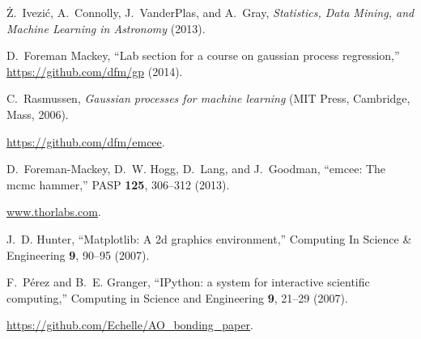 \documentclass[osajnl,twocolumn,showpacs,superscriptaddress,11pt]{revtex4-1} %
\begin{document}
\begin{thebibliography}{10}
{\.Z}.~{Ivezi{\'c}}, A.~{Connolly}, J.~{VanderPlas}, and A.~{Gray},
  \emph{{Statistics, Data Mining, and Machine Learning in Astronomy}} (2013).

D.~{F}oreman Mackey, \enquote{Lab section for a course on gaussian process
  regression,} \url{https://github.com/dfm/gp} (2014).

C.~Rasmussen, \emph{Gaussian processes for machine learning} (MIT Press,
  Cambridge, Mass, 2006).

\protect \url {https://github.com/dfm/emcee}.

D.~{Foreman-Mackey}, D.~W. {Hogg}, D.~{Lang}, and J.~{Goodman}, \enquote{emcee:
  The mcmc hammer,} PASP \textbf{125}, 306--312 (2013).

\protect \url {www.thorlabs.com}.

J.~D. Hunter, \enquote{Matplotlib: A 2d graphics environment,} Computing In
  Science \& Engineering \textbf{9}, 90--95 (2007).

F.~P\'erez and B.~E. Granger, \enquote{{IP}ython: a system for interactive
  scientific computing,} Computing in Science and Engineering \textbf{9},
  21--29 (2007).

\protect \url {https://github.com/Echelle/AO_bonding_paper}.

\end{thebibliography}
\end{document}
